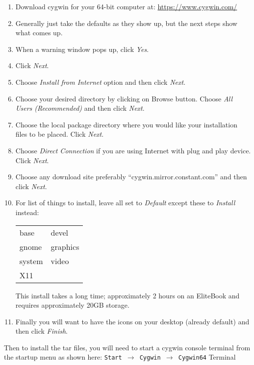 \begin{enumerate}
\item Download cygwin for your 64-bit computer at:
  \href{https://www.cygwin.com/}{https://www.cygwin.com/}

\item Generally just take the defaults as they show up, but the
  next steps show what comes up.

\item When a warning window pops up, click \textit{Yes}.

\item Click \textit{Next}.

\item Choose \textit{Install from Internet} option and then click
  \textit{Next}.

\item Choose your desired directory by clicking on Browse
  button. Choose \textit{All Users (Recommended)} and then click
  \textit{Next}.

\item Choose the local package directory where you would like your
  installation files to be placed. Click \textit{Next}.

\item Choose \textit{Direct Connection} if you are using Internet
  with plug and play device. Click \textit{Next}.

\item Choose any download site preferably
  ``cygwin.mirror.constant.com'' and then click \textit{Next}.

\item For list of things to install, leave all set to
  \textit{Default} except these to \textit{Install} instead:

  \begin{tabular}{ll}
    base& devel\\
    gnome& graphics\\
    system& video\\
    X11
  \end{tabular}

  This install takes a long time; approximately 2 hours on an
  EliteBook and requires approximately 20GB storage.

\item Finally you will want to have the icons on your desktop
  (already default) and then click \textit{Finish}.
\end{enumerate}

Then to install the \CGG{} tar files, you will need to start a
cygwin console terminal from the startup menu as shown here:
\texttt{Start $\rightarrow$ Cygwin $\rightarrow$ Cygwin64}
Terminal

